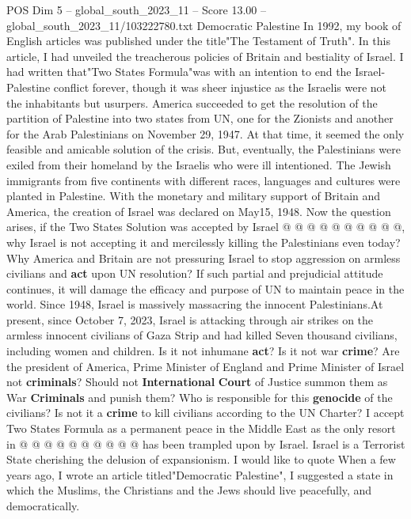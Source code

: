 \begin{textsample}{POS Dim 5 – global\_south\_2023\_11 – Score 13.00 – global\_south\_2023\_11/103222780.txt}  \label{ex:f5_pos_278}
Democratic Palestine In 1992, my book of English articles was published under the title"The Testament of Truth".
In this article, I had unveiled the treacherous policies of Britain and bestiality of Israel.
I had written that"Two States Formula"was with an intention to end the Israel- Palestine conflict forever, though it was sheer injustice as the Israelis were not the inhabitants but usurpers.
America succeeded to get the resolution of the partition of Palestine into two states from UN, one for the Zionists and another for the Arab Palestinians on November 29, 1947.
At that time, it seemed the only feasible and amicable solution of the crisis.
But, eventually, the Palestinians were exiled from their homeland by the Israelis who were ill intentioned.
The Jewish immigrants from five continents with different races, languages and cultures were planted in Palestine.
With the monetary and military support of Britain and America, the creation of Israel was declared on May15, 1948.
Now the question arises, if the Two States Solution was accepted by Israel @ @ @ @ @ @ @ @ @ @, why Israel is not accepting it and mercilessly killing the Palestinians even today?
Why America and Britain are not pressuring Israel to stop aggression on armless civilians and \textbf{act} upon UN resolution?
If such partial and prejudicial attitude continues, it will damage the efficacy and purpose of UN to maintain peace in the world.
Since 1948, Israel is massively massacring the innocent Palestinians.At present, since October 7, 2023, Israel is attacking through air strikes on the armless innocent civilians of Gaza Strip and had killed Seven thousand civilians, including women and children.
Is it not inhumane \textbf{act}?
Is it not war \textbf{crime}?
Are the president of America, Prime Minister of England and Prime Minister of Israel not \textbf{criminals}?
Should not \textbf{International} \textbf{Court} of Justice summon them as War \textbf{Criminals} and punish them?
Who is responsible for this \textbf{genocide} of the civilians?
Is not it a \textbf{crime} to kill civilians according to the UN Charter?
I accept Two States Formula as a permanent peace in the Middle East as the only resort in @ @ @ @ @ @ @ @ @ @ has been trampled upon by Israel.
Israel is a Terrorist State cherishing the delusion of expansionism.
I would like to quote When a few years ago, I wrote an article titled"Democratic Palestine", I suggested a state in which the Muslims, the Christians and the Jews should live peacefully, and democratically.

\end{textsample}
